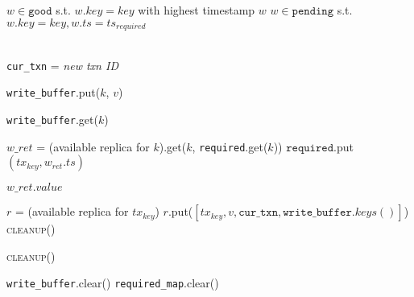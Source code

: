 \begin{algorithm}[t!]
\begin{addmargin}[-1em]{0em}
\begin{algorithmic}
  \State \Return $w \in \texttt{good}$ s.t. $w.key = key$ with highest timestamp
  \State \Return $w$
  \Else
  \State \Return $w \in \texttt{pending}$ s.t. $w.key = key,  w.ts = ts_{required}$
  \EndIf
  \EndProcedure\\\vspace{-.5em}\hrulefill\vspace{.25em}

  \\


  \State \texttt{cur\_txn} = \textit{new txn ID} 
  \EndProcedure\vspace{.5em}

  \State \texttt{write\_buffer}.put($k$, $v$)
\EndProcedure\vspace{.5em}

  \State \Return \texttt{write\_buffer}.get($k$) 
  \EndIf

  \State $w\_{ret}$ = (available replica for $k$).get($k$, \texttt{required}.get($k$))
  \State $\texttt{required}$.put$(tx_{key}, w_{ret}.ts)$
  \EndIf
  \EndFor

  \State \Return $w\_{ret}.value$
\EndProcedure\vspace{.5em}


 \State $r$ = (available replica for $tx_{key}$)
 \State $r$.put($[tx_{key}, v, \texttt{cur\_txn}, \texttt{write\_buffer}.keys()]$)
 \EndFor
  \State \textsc{cleanup()}
\EndProcedure\vspace{.5em}


  \State \textsc{cleanup()}
\EndProcedure\vspace{.5em}


  \State \texttt{write\_buffer}.clear()
  \State \texttt{required\_map}.clear()
\EndProcedure\vspace{.5em}


\end{algorithmic}
\end{addmargin}
\end{algorithm}

